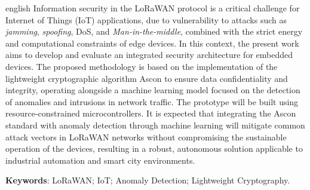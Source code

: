 \documentclass[
	12pt,				%
	openright,			%
	twoside,			%
	a4paper,			%
	english,			%
	brazilian				%
	]{abntex2}
\begin{document}
\begin{resumo}[Abstract]
 \begin{otherlanguage*}{english}
   Information security in the LoRaWAN protocol is a critical challenge for Internet of Things (IoT) applications, due to vulnerability to attacks such as \textit{jamming}, \textit{spoofing}, DoS, and \textit{Man-in-the-middle}, combined with the strict energy and computational constraints of edge devices. In this context, the present work aims to develop and evaluate an integrated security architecture for embedded devices. The proposed methodology is based on the implementation of the lightweight cryptographic algorithm Ascon to ensure data confidentiality and integrity, operating alongside a machine learning model focused on the detection of anomalies and intrusions in network traffic. The prototype will be built using resource-constrained microcontrollers. It is expected that integrating the Ascon standard with anomaly detection through machine learning will mitigate common attack vectors in LoRaWAN networks without compromising the sustainable operation of the devices, resulting in a robust, autonomous solution applicable to industrial automation and smart city environments.

   \vspace{\onelineskip}
 
   \noindent 
   \textbf{Keywords}: LoRaWAN; IoT; Anomaly Detection; Lightweight Cryptography.
 \end{otherlanguage*}
\end{resumo}

 

  

\listoffigures*
\cleardoublepage
\end{document}
